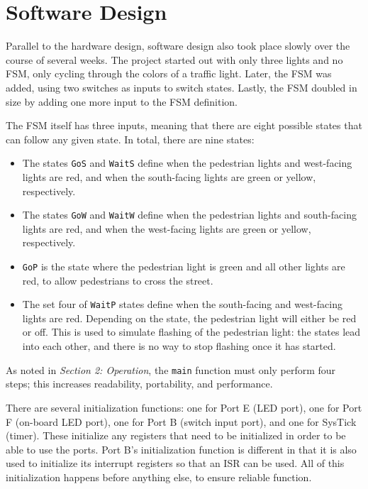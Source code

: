 \documentclass{article}
\renewcommand{\c}[1]{\texttt{#1}}
\begin{document}
\section{Software Design} Parallel to the hardware design,
software design also took place slowly over the course of
several weeks. The project started out with only three lights
and no FSM, only cycling through the colors of a traffic light.
Later, the FSM was added, using two switches as inputs to switch
states. Lastly, the FSM doubled in size by adding one more input
to the FSM definition.

The FSM itself has three inputs, meaning that there are
eight possible states that can follow any given state. In
total, there are nine states:
\begin{itemize}
    \item The states \c{GoS} and \c{WaitS} define when the
    pedestrian lights
    and west-facing lights are red, and when the south-facing
    lights are green or yellow, respectively.
    \item The states \c{GoW} and \c{WaitW} define when the
    pedestrian lights
    and south-facing lights are red, and when the west-facing
    lights are green or yellow, respectively.
    \item \c{GoP} is the state where the pedestrian light is
    green and all other lights are red, to allow pedestrians
    to cross the street.
    \item The set four of \c{WaitP} states define when the
    south-facing and west-facing lights are red. Depending
    on the state, the pedestrian light will either be
    red or off. This is used to simulate flashing of the
    pedestrian light: the states lead into each other,
    and there is no way to stop flashing once it has started.
\end{itemize}

As noted in \emph{Section 2: Operation}, the \c{main} function
must only perform four steps; this increases readability,
portability, and performance.

There are several initialization functions: one for Port E
(LED port), one for Port F (on-board LED port), one for
Port B (switch input port), and one for SysTick (timer).
These initialize any registers that need to be initialized
in order to be able to use the ports. Port B's initialization
function is different in that it is also used to initialize
its interrupt registers so that an ISR can be used. All of this
initialization happens before anything else, to ensure
reliable function.
\end{document}
